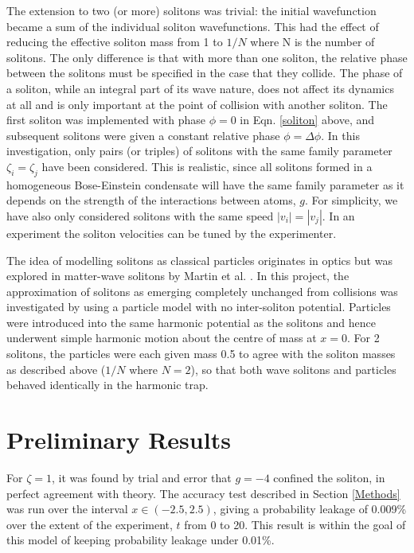 \documentclass[10pt, twocolumn]{revtex4}    %
\begin{document}
The extension to two (or more) solitons was trivial: the initial wavefunction became a sum of the individual soliton wavefunctions. This had the effect of reducing the effective soliton mass from 1 to $1/N$ where N is the number of solitons. The only difference is that with more than one soliton, the relative phase between the solitons must be specified in the case that they collide. The phase of a soliton, while an integral part of its wave nature, does not affect its dynamics at all and is only important at the point of collision with another soliton. The first soliton was implemented with phase $\phi = 0$ in Eqn. \ref{soliton} above, and subsequent solitons were given a constant relative phase $\phi=\Delta \phi$. In this investigation, only pairs (or triples) of solitons with the same family parameter $\zeta_i=\zeta_j$ have been considered. This is realistic, since all solitons formed in a homogeneous Bose-Einstein condensate will have the same family parameter as it depends on the strength of the interactions between atoms, $g$. For simplicity, we have also only considered solitons with the same speed $|v_i| = |v_j|$. In an experiment the soliton velocities can be tuned by the experimenter. 

The idea of modelling solitons as classical particles originates in optics but was explored in matter-wave solitons by Martin et al. \cite{Martin}. In this project, the approximation of solitons as emerging completely unchanged from collisions was investigated by using a particle model with no inter-soliton potential. Particles were introduced into the same harmonic potential as the solitons and hence underwent simple harmonic motion about the centre of mass at $x=0$. For 2 solitons, the particles were each given mass 0.5 to agree with the soliton masses as described above ($1/N$ where $N=2$), so that both wave solitons and particles behaved identically in the harmonic trap. 


\section{Preliminary Results} \label{Milestone}

 For $\zeta=1$, it was found by trial and error that $g=-4$ confined the soliton, in perfect agreement with theory. The accuracy test described in Section \ref{Methods} was run over the interval $x \in (-2.5,2.5)$, giving a probability leakage of 0.009\% over the extent of the experiment, $t$ from 0 to 20. This result is within the goal of this model of keeping probability leakage under 0.01\%. 
\end{document}
